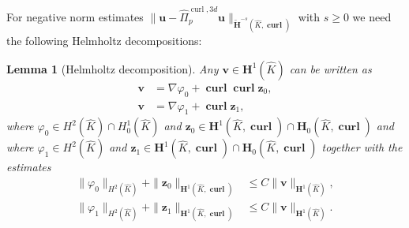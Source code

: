 \documentclass{article}
\newtheorem{lemma}[theorem]{Lemma}
\newcommand{\hatPicurlcom}{\widehat \Pi^{\operatorname*{curl},3d}_p}
\begin{document}
For negative norm estimates $\|{\mathbf u} - \hatPicurlcom {\mathbf u}\|_{\widetilde {\mathbf H}^{-s}(\widehat K,
\operatorname{\mathbf{curl}})}$ with $s \ge 0$ we need the following Helmholtz decompositions: 
\begin{lemma}[Helmholtz decomposition] 
\label{lemma:helmholtz-3d}
Any ${\mathbf v} \in {\mathbf H}^1(\widehat K)$ can be written as 
\begin{align}
\label{eq:lemma:helmholtz-3d-10}
{\mathbf v} & = \nabla \varphi_0 + \operatorname{\mathbf{ curl}} \operatorname{\mathbf{curl}} {\mathbf z}_0, \\ 
\label{eq:lemma:helmholtz-3d-20}
{\mathbf v} & = \nabla \varphi_1 + \operatorname{\mathbf{curl}} {\mathbf z}_1,
\end{align}
where $\varphi_0 \in H^2(\widehat K) \cap H^1_0(\widehat K)$ and 
${\mathbf z}_0 \in {\mathbf H}^1(\widehat K,\operatorname{\mathbf{curl}}) \cap {\mathbf H}_0(\widehat K,\operatorname{\mathbf{curl}})$ and 
where $\varphi_1 \in H^2(\widehat K)$ and 
${\mathbf z}_1 \in {\mathbf H}^1(\widehat K,\operatorname{\mathbf{curl}}) \cap {\mathbf H}_0(\widehat K,\operatorname{\mathbf{curl}})$ together with the estimates 
\begin{align*}
\|\varphi_0\|_{H^2(\widehat K)} + 
\|{\mathbf z}_0\|_{{\mathbf H}^1(\widehat K,\operatorname{\mathbf{curl}})} 
& \leq C \|{\mathbf v}\|_{{\mathbf H}^1(\widehat K)}, \\
\|\varphi_1\|_{H^2(\widehat K)} + 
\|{\mathbf z}_1\|_{{\mathbf H}^1(\widehat K,\operatorname{\mathbf{curl}})} 
& \leq C \|{\mathbf v}\|_{{\mathbf H}^1(\widehat K)}. 
\end{align*}
\end{lemma}
\end{document}
